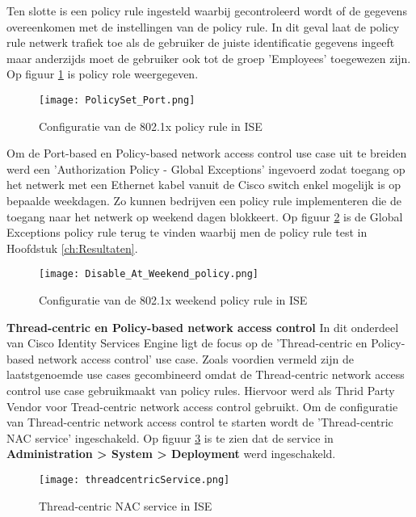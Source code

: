  	Ten slotte is een policy rule ingesteld waarbij gecontroleerd wordt of de gegevens overeenkomen met de instellingen van de policy rule. In dit geval laat de policy rule netwerk trafiek toe als de gebruiker de juiste identificatie gegevens ingeeft maar anderzijds moet de gebruiker ook tot de groep 'Employees' toegewezen zijn. Op figuur \ref{fig:ISESwitch} is policy role weergegeven.
 	
	 	 \begin{figure}[H]
		\centering
		\texttt{[image: PolicySet\_Port.png]}
		\caption{Configuratie van de 802.1x policy rule in ISE}%
		\label{fig:ISESwitch}%
		\end{figure}
	
	Om de Port-based en Policy-based network access control use case uit te breiden werd een 'Authorization Policy - Global Exceptions' ingevoerd zodat toegang op het netwerk met een Ethernet kabel vanuit de Cisco switch enkel mogelijk is op bepaalde weekdagen. Zo kunnen bedrijven een policy rule implementeren die de toegang naar het netwerk op weekend dagen blokkeert. Op figuur \ref{fig:weekend} is de Global Exceptions policy rule terug te vinden waarbij men de policy rule test in Hoofdstuk \ref{ch:Resultaten}. 
	
	\begin{figure}[H]
		\centering
		\texttt{[image: Disable\_At\_Weekend\_policy.png]}
		\caption{Configuratie van de 802.1x weekend policy rule in ISE}%
		\label{fig:weekend}%
	\end{figure}
\fontsize{12}{20}\textbf{Thread-centric en Policy-based network access control }
 \newline
 \newline
 In dit onderdeel van Cisco Identity Services Engine ligt de focus op de 'Thread-centric en Policy-based network access control' use case. Zoals voordien vermeld zijn de laatstgenoemde use cases gecombineerd omdat de Thread-centric network access control use case gebruikmaakt van policy rules. Hiervoor werd \cite{Rapid7_nexpose} als Thrid Party Vendor voor Tread-centric network access control gebruikt.
 \newline
 \newline
 Om de configuratie van Thread-centric network access control te starten wordt de 'Thread-centric NAC service' ingeschakeld. Op figuur \ref{fig:serviceThread} is te zien dat de service in \textbf{Administration > System > Deployment} werd ingeschakeld.
 
\begin{figure}[H]
		 	\centering
		 	\texttt{[image: threadcentricService.png]}
		 	\caption{Thread-centric NAC service in ISE}%
		 	\label{fig:serviceThread}%
\end{figure}

